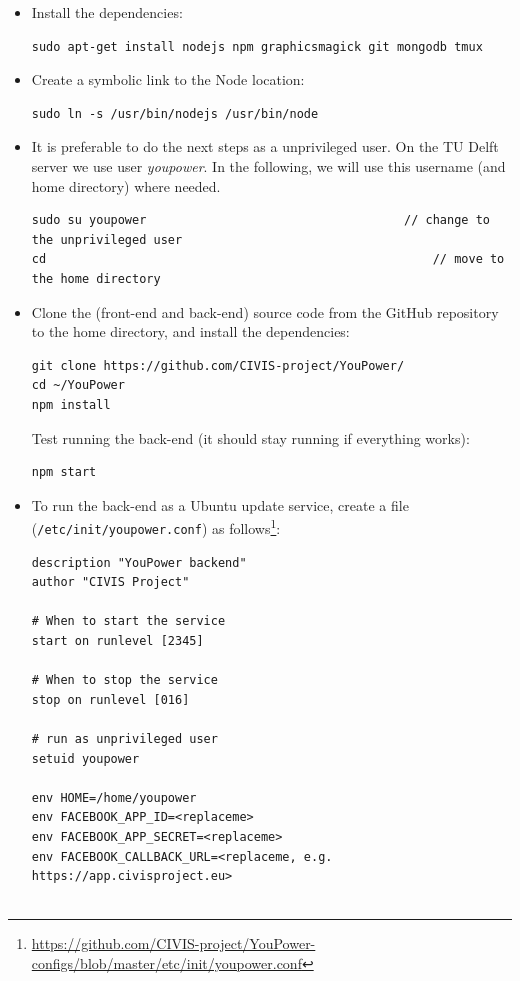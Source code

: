 \begin{itemize}
\item Install the dependencies: 
\begin{lstlisting}
sudo apt-get install nodejs npm graphicsmagick git mongodb tmux 
\end{lstlisting}

\item Create a symbolic link to the Node location: 
\begin{lstlisting}
sudo ln -s /usr/bin/nodejs /usr/bin/node
\end{lstlisting}

\item It is preferable to do the next steps as a unprivileged user. On the TU Delft server we use user \textit{youpower}. In the following, we will use this username (and home directory) where needed. 
\begin{lstlisting}
sudo su youpower 									// change to the unprivileged user
cd  													// move to the home directory
\end{lstlisting}

\item Clone the (front-end and back-end) source code from the GitHub repository to the home directory, and install the dependencies:  
\begin{lstlisting}
git clone https://github.com/CIVIS-project/YouPower/
cd ~/YouPower
npm install 
\end{lstlisting}
Test running the back-end (it should stay running if everything works):
\begin{lstlisting}
npm start
\end{lstlisting}

\item To run the back-end as a Ubuntu update service, create a file (\texttt{\small /etc/init/youpower.conf}) as follows\footnote{\url{https://github.com/CIVIS-project/YouPower-configs/blob/master/etc/init/youpower.conf}}:
\begin{lstlisting}
description "YouPower backend"
author "CIVIS Project"

# When to start the service
start on runlevel [2345]

# When to stop the service
stop on runlevel [016]

# run as unprivileged user
setuid youpower

env HOME=/home/youpower
env FACEBOOK_APP_ID=<replaceme>
env FACEBOOK_APP_SECRET=<replaceme>
env FACEBOOK_CALLBACK_URL=<replaceme, e.g. https://app.civisproject.eu>


\end{lstlisting}
\end{itemize}
